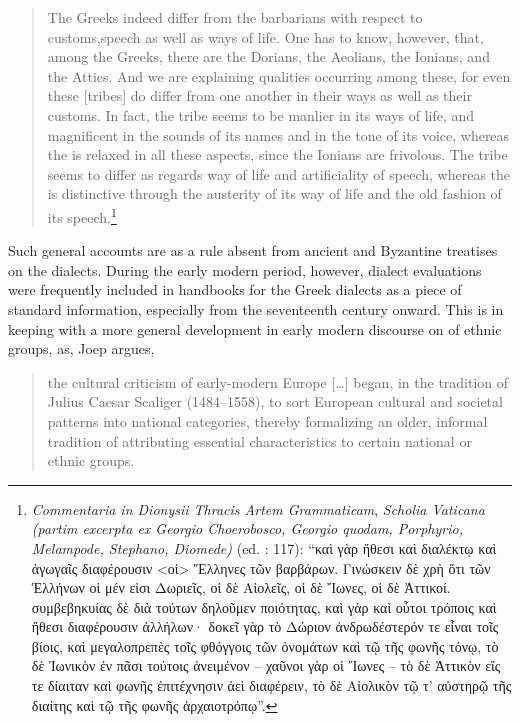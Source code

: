 \begin{quote}
The Greeks indeed differ from the barbarians with respect to customs,\linebreak speech as well as ways of life. One has to know, however, that, among the Greeks, there are the Dorians, the Aeolians, the Ionians, and the Attics. And we are explaining qualities occurring among these, for even these [tribes] do differ from one another in their ways as well as their customs. In fact, the  tribe seems to be manlier in its ways of life, and magnificent in the sounds of its names and in the tone of its voice, whereas the  is relaxed in all these aspects, since the Ionians are frivolous. The  tribe seems to differ as regards way of life and artificiality of speech, whereas the  is distinctive through the austerity of its way of life and the old fashion of its speech.\footnote{%
  \textit{Commentaria in Dionysii Thracis Artem Grammaticam}, \textit{Scholia Vaticana (partim excerpta ex Georgio Choerobosco, Georgio quodam, Porphyrio, Melampode, Stephano, Diomede)} (ed. \citealt{Hilgard1901}: 117): 
  “καὶ γὰρ ἤθεσι καὶ διαλέκτῳ καὶ ἀγωγαῖς διαφέρουσιν <οἱ> Ἕλληνες τῶν βαρβάρων. Γινώσκειν δὲ χρὴ ὅτι τῶν Ἑλλήνων οἱ μέν εἰσι Δωριεῖς, οἱ δὲ Αἰολεῖς, οἱ δὲ Ἴωνες, οἱ δὲ Ἀττικοί. συμβεβηκυίας δὲ διὰ τούτων δηλοῦμεν ποιότητας, καὶ γὰρ καὶ οὗτοι τρόποις καὶ ἤθεσι διαφέρουσιν ἀλλήλων· δοκεῖ γὰρ τὸ Δώριον ἀνδρωδέστερόν τε εἶναι τοῖς βίοις, καὶ μεγαλοπρεπὲς τοῖς φθόγγοις τῶν ὀνομάτων καὶ τῷ τῆς φωνῆς τόνῳ, τὸ δὲ Ἰωνικὸν ἐν πᾶσι τούτοις ἀνειμένον – χαῦνοι γὰρ οἱ Ἴωνες – τὸ δὲ Ἀττικὸν εἴς τε δίαιταν καὶ φωνῆς ἐπιτέχνησιν ἀεὶ διαφέρειν, τὸ δὲ Αἰολικὸν τῷ τ’ αὐστηρῷ τῆς διαίτης καὶ τῷ τῆς φωνῆς ἀρχαιοτρόπῳ”.}
\end{quote}

Such general accounts are as a rule absent from ancient and Byzantine treatises on the dialects. During the early modern period, however, dialect evaluations were frequently included in handbooks for the Greek dialects as a piece of standard information, especially from the seventeenth century onward. This is in keeping with a more general development in early modern discourse on  of ethnic groups, as, Joep \citet[17]{Leerssen2007} argues,

\begin{quote}
the cultural criticism of early-modern Europe […] began, in the tradition of Julius Caesar Scaliger (1484–1558), to sort European cultural and societal patterns into national categories, thereby formalizing an older, informal tradition of attributing essential characteristics to certain national or ethnic groups.
\end{quote}

